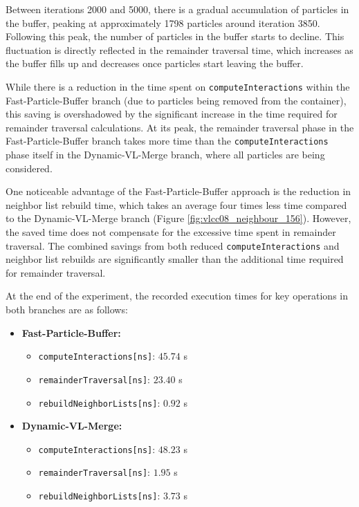 Between iterations 2000 and 5000, there is a gradual accumulation of particles in the buffer, peaking at approximately 1798 particles around iteration 3850. Following this peak, the number of particles in the buffer starts to decline. This fluctuation is directly reflected in the remainder traversal time, which increases as the buffer fills up and decreases once particles start leaving the buffer. 

While there is a reduction in the time spent on \texttt{computeInteractions} within the Fast-Particle-Buffer branch (due to particles being removed from the container), this saving is overshadowed by the significant increase in the time required for remainder traversal calculations. At its peak, the remainder traversal phase in the Fast-Particle-Buffer branch takes more time than the \texttt{computeInteractions} phase itself in the Dynamic-VL-Merge branch, where all particles are being considered. 

One noticeable advantage of the Fast-Particle-Buffer approach is the reduction in neighbor list rebuild time, which takes an average four times less time compared to the Dynamic-VL-Merge branch (Figure \ref{fig:vlcc08_neighbour_156}). However, the saved time does not compensate for the excessive time spent in remainder traversal. The combined savings from both reduced \texttt{computeInteractions} and neighbor list rebuilds are significantly smaller than the additional time required for remainder traversal.

At the end of the experiment, the recorded execution times for key operations in both branches are as follows:

\begin{itemize}
    \item \textbf{Fast-Particle-Buffer:}
    \begin{itemize}
        \item \texttt{computeInteractions[ns]}: $45.74$ s
        \item \texttt{remainderTraversal[ns]}: $23.40$ s
        \item \texttt{rebuildNeighborLists[ns]}: $0.92$ s
    \end{itemize}
    \item \textbf{Dynamic-VL-Merge:}
    \begin{itemize}
        \item \texttt{computeInteractions[ns]}: $48.23$ s
        \item \texttt{remainderTraversal[ns]}: $1.95$ s
        \item \texttt{rebuildNeighborLists[ns]}: $3.73$ s
    \end{itemize}
\end{itemize}

